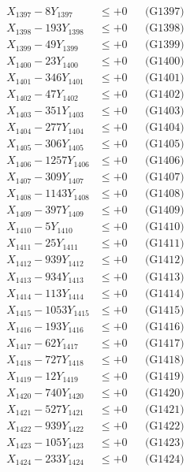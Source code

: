 \documentclass[a4paper,10pt]{article}
\begin{document}
{\begin{align}
X_{1397} - 8Y_{1397} &\leq +0 && \text{(G1397)} \\
X_{1398} - 193Y_{1398} &\leq +0 && \text{(G1398)} \\
X_{1399} - 49Y_{1399} &\leq +0 && \text{(G1399)} \\
X_{1400} - 23Y_{1400} &\leq +0 && \text{(G1400)} \\
\allowbreak
X_{1401} - 346Y_{1401} &\leq +0 && \text{(G1401)} \\
X_{1402} - 47Y_{1402} &\leq +0 && \text{(G1402)} \\
X_{1403} - 351Y_{1403} &\leq +0 && \text{(G1403)} \\
X_{1404} - 277Y_{1404} &\leq +0 && \text{(G1404)} \\
X_{1405} - 306Y_{1405} &\leq +0 && \text{(G1405)} \\
X_{1406} - 1257Y_{1406} &\leq +0 && \text{(G1406)} \\
X_{1407} - 309Y_{1407} &\leq +0 && \text{(G1407)} \\
X_{1408} - 1143Y_{1408} &\leq +0 && \text{(G1408)} \\
X_{1409} - 397Y_{1409} &\leq +0 && \text{(G1409)} \\
X_{1410} - 5Y_{1410} &\leq +0 && \text{(G1410)} \\
\allowbreak
X_{1411} - 25Y_{1411} &\leq +0 && \text{(G1411)} \\
X_{1412} - 939Y_{1412} &\leq +0 && \text{(G1412)} \\
X_{1413} - 934Y_{1413} &\leq +0 && \text{(G1413)} \\
X_{1414} - 113Y_{1414} &\leq +0 && \text{(G1414)} \\
X_{1415} - 1053Y_{1415} &\leq +0 && \text{(G1415)} \\
X_{1416} - 193Y_{1416} &\leq +0 && \text{(G1416)} \\
X_{1417} - 62Y_{1417} &\leq +0 && \text{(G1417)} \\
X_{1418} - 727Y_{1418} &\leq +0 && \text{(G1418)} \\
X_{1419} - 12Y_{1419} &\leq +0 && \text{(G1419)} \\
X_{1420} - 740Y_{1420} &\leq +0 && \text{(G1420)} \\
\allowbreak
X_{1421} - 527Y_{1421} &\leq +0 && \text{(G1421)} \\
X_{1422} - 939Y_{1422} &\leq +0 && \text{(G1422)} \\
X_{1423} - 105Y_{1423} &\leq +0 && \text{(G1423)} \\
X_{1424} - 233Y_{1424} &\leq +0 && \text{(G1424)} \\

\end{align}}
\end{document}
